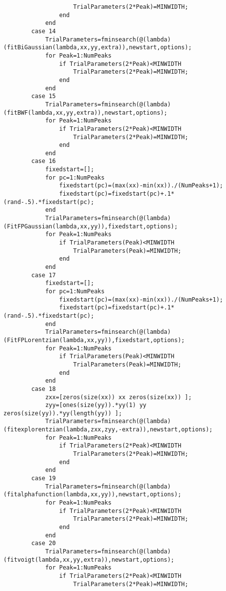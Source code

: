 \begin{lstlisting}
                    TrialParameters(2*Peak)=MINWIDTH;
                end
            end
        case 14
            TrialParameters=fminsearch(@(lambda)(fitBiGaussian(lambda,xx,yy,extra)),newstart,options);
            for Peak=1:NumPeaks
                if TrialParameters(2*Peak)<MINWIDTH
                    TrialParameters(2*Peak)=MINWIDTH;
                end
            end
        case 15
            TrialParameters=fminsearch(@(lambda)(fitBWF(lambda,xx,yy,extra)),newstart,options);
            for Peak=1:NumPeaks
                if TrialParameters(2*Peak)<MINWIDTH
                    TrialParameters(2*Peak)=MINWIDTH;
                end
            end
        case 16
            fixedstart=[];
            for pc=1:NumPeaks
                fixedstart(pc)=(max(xx)-min(xx))./(NumPeaks+1);
                fixedstart(pc)=fixedstart(pc)+.1*(rand-.5).*fixedstart(pc);
            end
            TrialParameters=fminsearch(@(lambda)(FitFPGaussian(lambda,xx,yy)),fixedstart,options);
            for Peak=1:NumPeaks
                if TrialParameters(Peak)<MINWIDTH
                    TrialParameters(Peak)=MINWIDTH;
                end
            end
        case 17
            fixedstart=[];
            for pc=1:NumPeaks
                fixedstart(pc)=(max(xx)-min(xx))./(NumPeaks+1);
                fixedstart(pc)=fixedstart(pc)+.1*(rand-.5).*fixedstart(pc);
            end
            TrialParameters=fminsearch(@(lambda)(FitFPLorentzian(lambda,xx,yy)),fixedstart,options);
            for Peak=1:NumPeaks
                if TrialParameters(Peak)<MINWIDTH
                    TrialParameters(Peak)=MINWIDTH;
                end
            end
        case 18
            zxx=[zeros(size(xx)) xx zeros(size(xx)) ];
            zyy=[ones(size(yy)).*yy(1) yy zeros(size(yy)).*yy(length(yy)) ];
            TrialParameters=fminsearch(@(lambda)(fitexplorentzian(lambda,zxx,zyy,-extra)),newstart,options);
            for Peak=1:NumPeaks
                if TrialParameters(2*Peak)<MINWIDTH
                    TrialParameters(2*Peak)=MINWIDTH;
                end
            end
        case 19
            TrialParameters=fminsearch(@(lambda)(fitalphafunction(lambda,xx,yy)),newstart,options);
            for Peak=1:NumPeaks
                if TrialParameters(2*Peak)<MINWIDTH
                    TrialParameters(2*Peak)=MINWIDTH;
                end
            end
        case 20
            TrialParameters=fminsearch(@(lambda)(fitvoigt(lambda,xx,yy,extra)),newstart,options);
            for Peak=1:NumPeaks
                if TrialParameters(2*Peak)<MINWIDTH
                    TrialParameters(2*Peak)=MINWIDTH;

\end{lstlisting}
